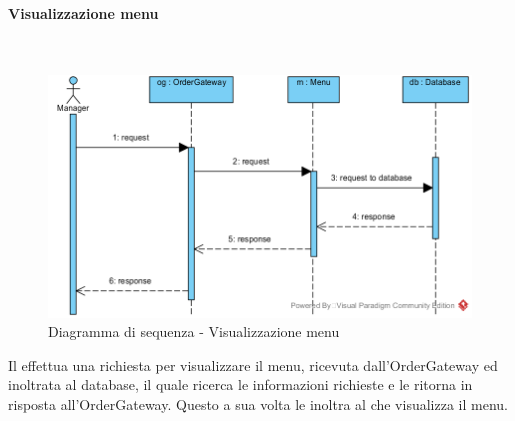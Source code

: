 \begin{samepage}
\paragraph{Visualizzazione menu}\mbox{}\\
\end{samepage}
\begin{figure}[H]
	\centering
	\includegraphics[width=14cm]{../../documenti/SpecificaTecnica/diagrammi_img/sequenza/direttore_visualizza_menu.png}
	\caption{Diagramma di sequenza - Visualizzazione menu}
\end{figure}
Il \Manager{} effettua una richiesta per visualizzare il menu, ricevuta dall'Order\-Gateway ed inoltrata al database, il quale ricerca le informazioni richieste e le ritorna in risposta all'Order\-Gateway. Questo a sua volta le inoltra al \Manager{} che visualizza il menu.

